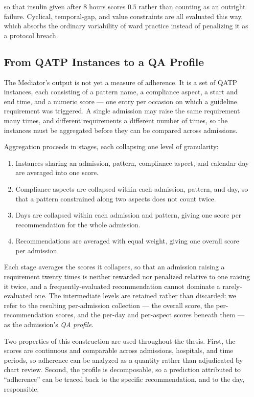 so that insulin given after $8$ hours scores $0.5$ rather than counting as an outright failure. Cyclical, temporal-gap, and value constraints are all evaluated this way, which absorbs the ordinary variability of ward practice instead of penalizing it as a protocol breach.

\subsection{From QATP Instances to a QA Profile}
\label{sec:prelim-qa-tree}

The Mediator's output is not yet a measure of adherence. It is a set of QATP instances, each consisting of a pattern name, a compliance aspect, a start and end time, and a numeric score --- one entry per occasion on which a guideline requirement was triggered. A single admission may raise the same requirement many times, and different requirements a different number of times, so the instances must be aggregated before they can be compared across admissions.

Aggregation proceeds in stages, each collapsing one level of granularity:

\begin{enumerate}
\item Instances sharing an admission, pattern, compliance aspect, and calendar day are averaged into one score.
\item Compliance aspects are collapsed within each admission, pattern, and day, so that a pattern constrained along two aspects does not count twice.
\item Days are collapsed within each admission and pattern, giving one score per recommendation for the whole admission.
\item Recommendations are averaged with equal weight, giving one overall score per admission.
\end{enumerate}

Each stage averages the scores it collapses, so that an admission raising a requirement twenty times is neither rewarded nor penalized relative to one raising it twice, and a frequently-evaluated recommendation cannot dominate a rarely-evaluated one. The intermediate levels are retained rather than discarded: we refer to the resulting per-admission collection --- the overall score, the per-recommendation scores, and the per-day and per-aspect scores beneath them --- as the admission's \emph{QA profile}.

Two properties of this construction are used throughout the thesis. First, the scores are continuous and comparable across admissions, hospitals, and time periods, so adherence can be analyzed as a quantity rather than adjudicated by chart review. Second, the profile is decomposable, so a prediction attributed to ``adherence'' can be traced back to the specific recommendation, and to the day, responsible.

